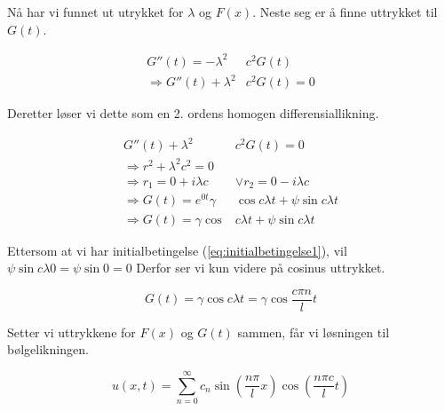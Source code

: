 Nå har vi funnet ut utrykket for $\lambda$ og $F(x)$. Neste seg er å finne uttrykket til $G(t)$.

\begin{align*}
	G''(t) = - \lambda^2 & c^2 G(t) \\
	\Rightarrow G''(t) + \lambda^2 & c^2 G(t) = 0 
\end{align*}

Deretter løser vi dette som en 2. ordens homogen differensiallikning.

\begin{align*}
	G''(t) + \lambda^2 & c^2 G(t) = 0 \\
	\Rightarrow r^2 + \lambda^2 c^2 = 0 \\
	\Rightarrow r_1 = 0 + i \lambda c &\vee r_2 = 0 - i \lambda c \\ 
	\Rightarrow G(t) = e^{0 t} \gamma&\cos c \lambda t + \psi \sin c \lambda t \\
	\Rightarrow G(t) = \gamma\cos & c \lambda t + \psi \sin c \lambda t
\end{align*}

Ettersom at vi har initialbetingelse (\ref{eq:initialbetingelse1}), vil $\psi \sin c \lambda 0 =\psi \sin 0 = 0$
Derfor ser vi kun videre på cosinus uttrykket. 

\begin{equation*}
	G(t) = \gamma \cos c \lambda t = \gamma \cos \frac{c \pi n}{l} t
\end{equation*}

Setter vi uttrykkene for $F(x)$ og $G(t)$ sammen, får vi løsningen til bølgelikningen.

\begin{equation}
	u(x,t) = \sum_{n=0}^{\infty} c_n 
	\sin \left( \frac{n \pi}{l} x \right)
	\cos \left( \frac{n \pi c}{l} t \right)
	\label{eq:bølgelikningLøst}	
\end{equation}

